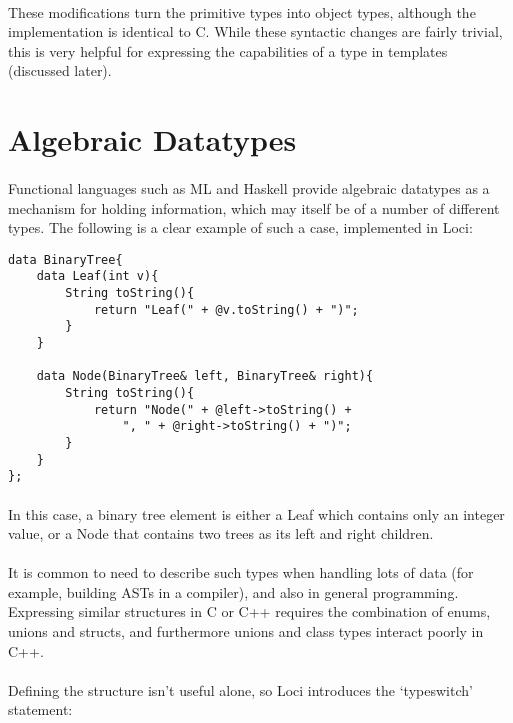 \documentclass[12pt,twoside,notitlepage]{report}
\begin{document}
\paragraph{}
These modifications turn the primitive types into object types, although the implementation is identical to C. While these syntactic changes are fairly trivial, this is very helpful for expressing the capabilities of a type in templates (discussed later).

\section{Algebraic Datatypes}

\paragraph{}
Functional languages such as ML and Haskell provide algebraic datatypes as a mechanism for holding information, which may itself be of a number of different types. The following is a clear example of such a case, implemented in Loci:

\small{
\begin{verbatim}
data BinaryTree{
    data Leaf(int v){
        String toString(){
            return "Leaf(" + @v.toString() + ")";
        }
    }
    
    data Node(BinaryTree& left, BinaryTree& right){
        String toString(){
            return "Node(" + @left->toString() +
                ", " + @right->toString() + ")";
        }
    }
};
\end{verbatim}
}

\paragraph{}
In this case, a binary tree element is either a Leaf which contains only an integer value, or a Node that contains two trees as its left and right children.

\paragraph{}
It is common to need to describe such types when handling lots of data (for example, building ASTs in a compiler), and also in general programming. Expressing similar structures in C or C++ requires the combination of enums, unions and structs, and furthermore unions and class types interact poorly in C++.

\paragraph{}
Defining the structure isn't useful alone, so Loci introduces the `typeswitch' statement:
\end{document}
